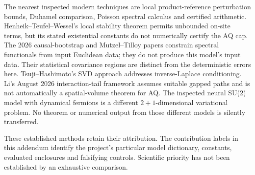 The nearest inspected modern techniques are local product-reference perturbation
bounds, Duhamel comparison, Poisson spectral calculus and certified arithmetic.
Henheik--Teufel--Wessel's local stability theorem \cite{htw} permits unbounded on-site terms,
but its stated existential constants do not numerically certify the AQ cap.
The 2026 causal-bootstrap and Mutzel--Tilloy papers \cite{abbott,mutzel} constrain spectral
functionals from input Euclidean data; they do not produce this model's input
data. Their statistical covariance regions are distinct from the deterministic
errors here. Tsuji--Hashimoto's SVD approach \cite{tsuji} addresses inverse-Laplace
conditioning. Li's August 2026 interaction-tail framework \cite{li} assumes suitable
gapped paths and is not automatically a spatial-volume theorem for AQ.
The inspected neural SU(2) model with dynamical fermions is a different
$2+1$-dimensional variational problem. No theorem or numerical output from those
different models is silently transferred.

These established methods retain their attribution. The contribution labels in
this addendum identify the project's particular model dictionary, constants,
evaluated enclosures and falsifying controls. Scientific priority has not been
established by an exhaustive comparison.
